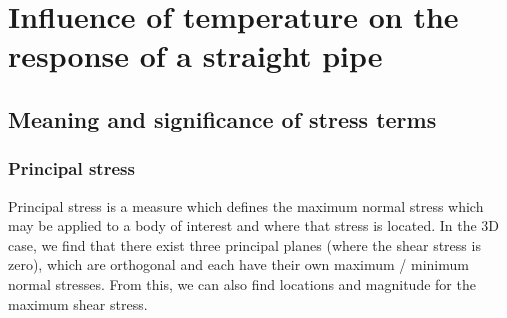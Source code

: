 \section{Influence of temperature on the response of a straight pipe}
\subsection{Meaning and significance of stress terms}
\subsubsection{Principal stress}
Principal stress is a measure which defines the maximum normal stress which may be applied to a body of interest and where that stress is located. %
In the 3D case, we find that there exist three principal planes (where the shear stress is zero), which are orthogonal and each have their own maximum / minimum normal stresses. From this, we can also find locations and magnitude for the maximum shear stress.

